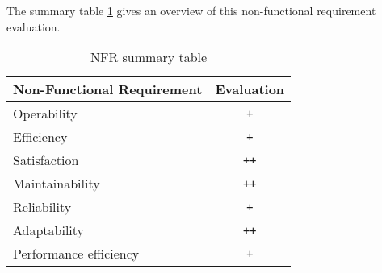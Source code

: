 The summary table \ref{tab:NFR} gives an overview of this
non-functional requirement evaluation.

\begin{table}
\centering
\begin{tabular}{l | c}
		 Non-Functional Requirement & Evaluation \\\hline
		 Operability & \verb|+| \\
		 Efficiency & \verb|+| \\
		 Satisfaction & \verb|++| \\
		 Maintainability & \verb|++| \\
		 Reliability & \verb|+| \\
		 Adaptability & \verb|++| \\
		 Performance efficiency & \verb|+|
	\end{tabular}
	\caption{NFR summary table}
	\label{tab:NFR}
\end{table}

